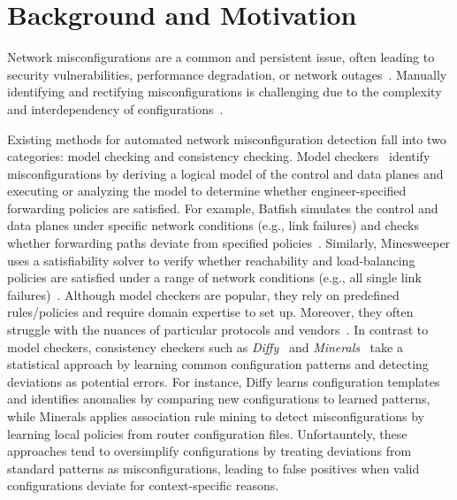 \section{Background and Motivation}
\label{sec_background}
Network misconfigurations are a common and persistent issue, often leading to security vulnerabilities, performance degradation, or network outages~\cite{zheng2012atpg, feamster2005detecting}. Manually identifying and rectifying  misconfigurations is challenging due to the complexity and interdependency of configurations~\cite{le2007rr, benson2009complexitymetrics}.

Existing methods for automated network misconfiguration detection fall into two categories: model checking and consistency checking. Model checkers~\cite{fogel2015general, beckett2017general, abhashkumar2020tiramisu, prabhu2020plankton, zhang2022sre, steffen2020netdice, ye2020hoyan, ritchey2000using,al2011configchecker, jeffrey2009model} identify misconfigurations by deriving a logical model of the control and data planes and executing or analyzing the model to determine whether engineer-specified forwarding policies are satisfied.
For example, Batfish simulates the control and data planes under specific network conditions (e.g., link failures) and checks whether forwarding paths deviate from specified policies~\cite{fogel2015general}. Similarly, Minesweeper uses a satisfiability solver to verify whether reachability and load-balancing policies are satisfied under a range of network conditions (e.g., all single link failures)~\cite{beckett2017general}.
Although model checkers are popular, they rely on predefined rules/policies and require domain expertise to set up. Moreover, they often struggle with the nuances of particular protocols and vendors~\cite{ye2020hoyan, birkner2021metha}.
In contrast to model checkers, consistency checkers such as \textit{Diffy}~\cite{kakarla2024diffy} and \textit{Minerals}~\cite{le2006minerals} take a statistical approach by learning common configuration patterns and detecting deviations as potential errors.
For instance, Diffy learns configuration templates and identifies anomalies by
comparing new configurations to learned patterns, while Minerals applies
association rule mining to detect misconfigurations by learning local policies
from router configuration files. Unfortauntely, these approaches tend to oversimplify configurations by treating deviations from standard patterns as misconfigurations, leading to false positives when valid configurations deviate for context-specific reasons.

